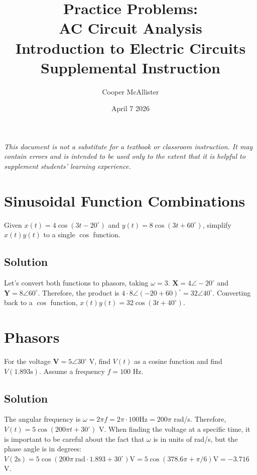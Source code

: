 \documentclass{article}
\title{Practice Problems: \\AC Circuit Analysis \\  \large Introduction to Electric Circuits \\ Supplemental Instruction}
\author{Cooper McAllister}
\date{April 7 2026}
\begin{document}
 {
	\fancyhf{}
	\renewcommand{\headrulewidth}{0pt}
	\renewcommand{\footrulewidth}{0.4pt}
	\fancyfoot[R]{\thepage}
}
\pagestyle{footerstyle}
\maketitle
\thispagestyle{footerstyle}

\begin{center}
\textit{This document is not a substitute for a textbook or classroom instruction. It may contain errors and is intended to be used only to the extent that it is helpful to supplement students' learning experience.}
\end{center}

\section{Sinusoidal Function Combinations}
Given $x(t) = 4\cos(3t - 20^\circ)$ and $y(t) = 8\cos(3t + 60^\circ)$, simplify $x(t)y(t)$ to a single $\cos$ function.
\subsection*{Solution}
Let's convert both functions to phasors, taking $\omega = 3$. $\bm{X} = 4\angle -20^\circ$ and $\bm{Y} = 8\angle 60^\circ$. Therefore, the product is $4\cdot8\angle (-20 + 60)^\circ = 32\angle 40^\circ$. Converting back to a $\cos$ function, $x(t)y(t) = 32\cos(3t + 40^\circ)$.


\section{Phasors}
For the voltage $\bm{V} = 5\angle 30^\circ$ V, find $V(t)$ as a cosine function and find $V(1.893\textrm{s})$. Assume a frequency $f = 100$ Hz.
\subsection*{Solution}
The angular frequency is $\omega = 2\pi f = 2\pi\cdot 100 \textrm{Hz} = 200\pi$ rad/s. Therefore,
$V(t) = 5\cos(200\pi t + 30^\circ)$ V. When finding the voltage at a specific time, it is important to be careful about the fact that $\omega$ is in units of rad/s, but the phase angle is in degrees: $V(2\textrm{s}) = 5\cos(200\pi \ \textrm{rad}\cdot1.893 + 30^\circ) \textrm{V}= 5\cos(378.6\pi + \pi / 6) \textrm{V} = -3.716$ V.
\end{document}
